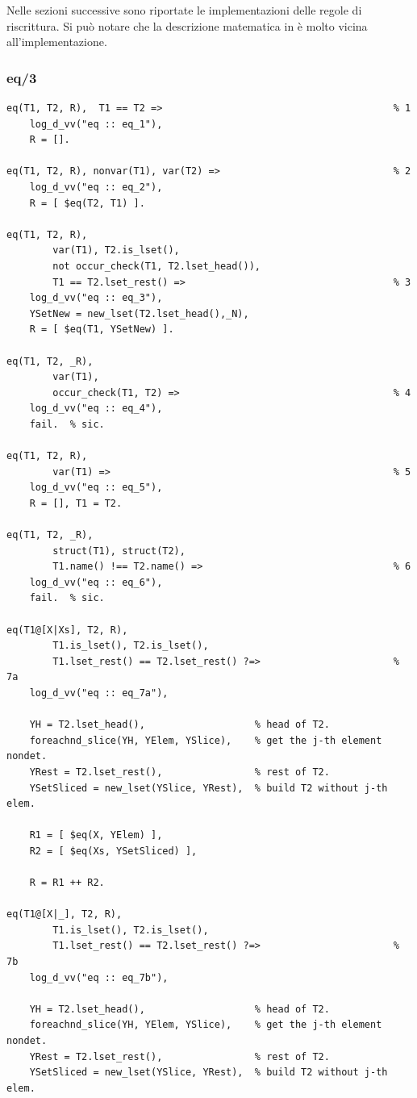 \documentclass[12pt,a4paper,openright]{book} %
\begin{document}
Nelle sezioni successive sono riportate le implementazioni delle regole di riscrittura. Si può notare che la descrizione matematica in \cite{Rossi18} è molto vicina all'implementazione.

\subsubsection{eq/3}

\begin{verbatim}
eq(T1, T2, R),  T1 == T2 =>                                        % 1
    log_d_vv("eq :: eq_1"),
    R = [].

eq(T1, T2, R), nonvar(T1), var(T2) =>                              % 2
    log_d_vv("eq :: eq_2"),
    R = [ $eq(T2, T1) ].

eq(T1, T2, R), 
        var(T1), T2.is_lset(),
	    not occur_check(T1, T2.lset_head()),
        T1 == T2.lset_rest() =>                                    % 3
    log_d_vv("eq :: eq_3"),
    YSetNew = new_lset(T2.lset_head(),_N),
    R = [ $eq(T1, YSetNew) ].

eq(T1, T2, _R), 
        var(T1),
        occur_check(T1, T2) =>                                     % 4
    log_d_vv("eq :: eq_4"),
    fail.  % sic.

eq(T1, T2, R), 
        var(T1) =>                                                 % 5
    log_d_vv("eq :: eq_5"),
    R = [], T1 = T2.

eq(T1, T2, _R), 
        struct(T1), struct(T2), 
        T1.name() !== T2.name() =>                                 % 6
    log_d_vv("eq :: eq_6"),
    fail.  % sic.

eq(T1@[X|Xs], T2, R), 
        T1.is_lset(), T2.is_lset(),
        T1.lset_rest() == T2.lset_rest() ?=>                       % 7a
    log_d_vv("eq :: eq_7a"),

    YH = T2.lset_head(),                   % head of T2.
    foreachnd_slice(YH, YElem, YSlice),    % get the j-th element nondet.
    YRest = T2.lset_rest(),                % rest of T2.
    YSetSliced = new_lset(YSlice, YRest),  % build T2 without j-th elem.

    R1 = [ $eq(X, YElem) ],
    R2 = [ $eq(Xs, YSetSliced) ],

    R = R1 ++ R2.

eq(T1@[X|_], T2, R), 
        T1.is_lset(), T2.is_lset(),
        T1.lset_rest() == T2.lset_rest() ?=>                       % 7b
    log_d_vv("eq :: eq_7b"),

    YH = T2.lset_head(),                   % head of T2.
    foreachnd_slice(YH, YElem, YSlice),    % get the j-th element nondet.
    YRest = T2.lset_rest(),                % rest of T2.
    YSetSliced = new_lset(YSlice, YRest),  % build T2 without j-th elem.


\end{verbatim}
\end{document}
